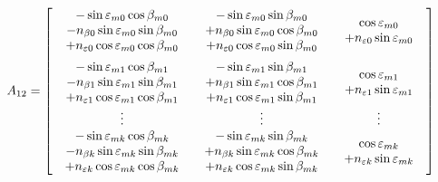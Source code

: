 \begin{equation}
	A_{12} = \left[\begin{array}{ccc}
		\vspace{5pt}
		\begin{array}{c}
			-\sin\varepsilon_{m0}\cos\beta_{m0} \\- n_{\beta 0}\sin\varepsilon_{m0}\sin\beta_{m0} \\+n_{\varepsilon 0}\cos\varepsilon_{m0}\cos\beta_{m0}
		\end{array} & \begin{array}{c}
			-\sin\varepsilon_{m0}\sin\beta_{m0} \\+n_{\beta 0}\sin\varepsilon_{m0}\cos\beta_{m0} \\+n_{\varepsilon 0} \cos\varepsilon_{m0}\sin\beta_{m0}
		\end{array} & \begin{array}{c}
			\cos\varepsilon_{m0} \\+ n_{\varepsilon 0}\sin\varepsilon_{m0}
		\end{array} \\ 
		\begin{array}{c}
			-\sin\varepsilon_{m1}\cos\beta_{m1} \\- n_{\beta 1}\sin\varepsilon_{m1}\sin\beta_{m1} \\+n_{\varepsilon 1}\cos\varepsilon_{m1}\cos\beta_{m1}
		\end{array} & \begin{array}{c}
			-\sin\varepsilon_{m1}\sin\beta_{m1} \\+n_{\beta 1}\sin\varepsilon_{m1}\cos\beta_{m1} \\+n_{\varepsilon 1} \cos\varepsilon_{m1}\sin\beta_{m1}
		\end{array} & \begin{array}{c}
			\cos\varepsilon_{m1} \\+ n_{\varepsilon 1}\sin\varepsilon_{m1}
		\end{array} \\ \vdots & \vdots & \vdots \\
		\begin{array}{c}
			-\sin\varepsilon_{mk}\cos\beta_{mk} \\- n_{\beta k}\sin\varepsilon_{mk}\sin\beta_{mk} \\+n_{\varepsilon k}\cos\varepsilon_{mk}\cos\beta_{mk}
		\end{array} & \begin{array}{c}
			-\sin\varepsilon_{mk}\sin\beta_{mk} \\+n_{\beta k}\sin\varepsilon_{mk}\cos\beta_{mk} \\+n_{\varepsilon k} \cos\varepsilon_{mk}\sin\beta_{mk}
		\end{array} & \begin{array}{c}
			\cos\varepsilon_{mk} \\+ n_{\varepsilon k}\sin\varepsilon_{mk}
		\end{array} 
	\end{array}\right]
\end{equation}
